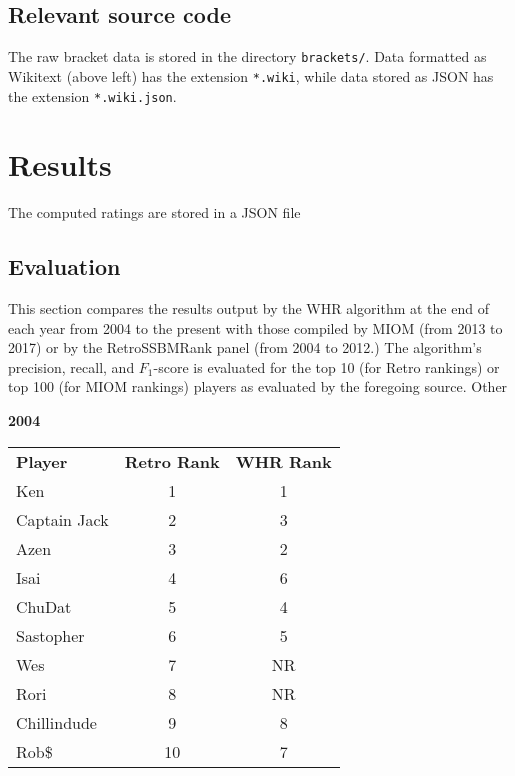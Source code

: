 \documentclass[10pt]{article}
\theoremstyle{definition}
\theoremstyle{remark}
\begin{document}
\subsection{Relevant source code}
The raw bracket data is stored in the directory \texttt{brackets/}. Data
formatted as Wikitext (above left) has the extension \texttt{*.wiki}, while
data stored as JSON has the extension \texttt{*.wiki.json}.

\section{Results}
The computed ratings are stored in a JSON file

\subsection{Evaluation}
This section compares the results output by the WHR algorithm at the end of
each year from 2004 to the present with those compiled by MIOM (from 2013 to
2017) or by the RetroSSBMRank panel (from 2004 to 2012.) The algorithm's
precision, recall, and $F_1$-score is evaluated for the top 10 (for Retro
rankings) or top 100 (for MIOM rankings) players as evaluated by the foregoing
source. Other 

\textbf{2004}
\begin{tabular}{lcc}
    \textbf{Player} & \textbf{Retro Rank} & \textbf{WHR Rank} \\
    Ken             & 1                      & 1        \\
    Captain Jack    & 2                      & 3        \\
    Azen            & 3                      & 2        \\
    Isai            & 4                      & 6        \\
    ChuDat          & 5                      & 4        \\
    Sastopher       & 6                      & 5        \\
    Wes             & 7                      & NR       \\
    Rori            & 8                      & NR       \\
    Chillindude     & 9                      & 8        \\
    Rob\$           & 10                     & 7        \\
\end{tabular}
\end{document}
